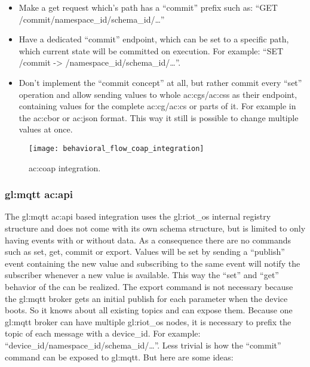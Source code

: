\begin{itemize}
    \item Make a get request which's path has a ``commit'' prefix such as:
          ``GET /commit/namespace\_id/schema\_id/\dots''

    \item Have a dedicated ``commit'' endpoint, which can be set to a specific path, which current state will be committed on execution.
          For example: ``SET /commit -> /namespace\_id/schema\_id/\dots''.

    \item Don't implement the ``commit concept'' at all, but rather commit every ``set'' operation and allow sending values to whole \glspl{ac:cg}/\glspl{ac:cs} as their endpoint, containing values for the complete \gls{ac:cg}/\gls{ac:cs} or parts of it.
          For example in the \gls{ac:cbor} or \gls{ac:json} format.
          This way it still is possible to change multiple values at once.
\end{itemize}

\begin{figure}[H]
    \centering
    \texttt{[image: behavioral\_flow\_coap\_integration]}
    \caption{\gls{ac:coap} integration.}
    \label{fig:coap_integration}
\end{figure}

\subsubsection{\gls*{gl:mqtt} \gls*{ac:api}}

The \gls{gl:mqtt} \gls*{ac:api} based integration uses the \gls{gl:riot_os} internal registry structure and does not come with its own schema structure, but is limited to only having events with or without data.
As a consequence there are no commands such as set, get, commit or export.
Values will be set by sending a ``publish'' event containing the new value and subscribing to the same event will notify the subscriber whenever a new value is available.
This way the ``set'' and ``get'' behavior of the  can be realized.
The export command is not necessary because the \gls{gl:mqtt} broker gets an initial publish for each parameter when the device boots.
So it knows about all existing topics and can expose them.
Because one \gls{gl:mqtt} broker can have multiple \gls{gl:riot_os} nodes, it is necessary to prefix the topic of each message with a device\_id.
For example: ``device\_id/namespace\_id/schema\_id/\dots''.
Less trivial is how the ``commit'' command can be exposed to \gls{gl:mqtt}. But here are some ideas:

